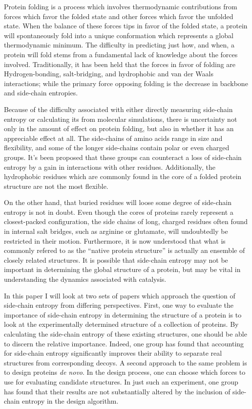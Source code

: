 Protein folding is a process which involves thermodynamic contributions from forces which favor the folded state and other forces which favor the unfolded state. When the balance of these forces tips in favor of the folded state, a protein will spontaneously fold into a unique conformation which represents a global thermodynamic minimum. The difficulty in predicting just how, and when, a protein will fold stems from a fundamental lack of knowledge about the forces involved. Traditionally, it has been held that the forces in favor of folding are Hydrogen-bonding, salt-bridging, and hydrophobic and van der Waals interactions; while the primary force opposing folding is the decrease in backbone and side-chain entropies.

Because of the difficulty associated with either directly measuring side-chain entropy or calculating its from molecular simulations, there is uncertainty not only in the amount of effect on protein folding, but also in whether it has an appreciable effect at all. The side-chains of amino acids range in size and flexibility, and some of the longer side-chains contain polar or even charged groups. It’s been proposed that these groups can counteract a loss of side-chain entropy by a gain in interactions with other residues. Additionally, the hydrophobic residues which are commonly found in the core of a folded protein structure are not the most flexible.

On the other hand, that buried residues will loose some degree of side-chain entropy is not in doubt. Even though the cores of proteins rarely represent a closest-packed configuration, the side chains of long, charged residues often found in internal salt bridges, such as arginine or glutamate, will undoubtedly be restricted in their motion. Furthermore, it is now understood that what is commonly refered to as the ``native protein structure'' is actually an ensemble of closely related structures. It is possible that side-chain entropy may not be important in determining the global structure of a protein, but may be vital in understanding the dynamics associated with catalysis.

In this paper I will look at two sets of papers which approach the question of side-chain entropy from differing perspectives. First, one way to evaluate the importance of side-chain entropy in determining the structure of a protein is to look at the experimentally determined structure of a collection of proteins. By calculating the side-chain entropy of these existing structures, one should be able to discern the relative importance. Indeed, one group has found that accounting for side-chain entropy significantly improves their ability to separate real structures from corresponding decoys. A second approach to the same problem is to design proteins \emph{de novo}. In the design process, one can choose which forces to use for evaluating candidate structures. In just such an experiment, one group has found that their results are not substantially altered by the inclusion of side-chain entropy in the design algorithm.

